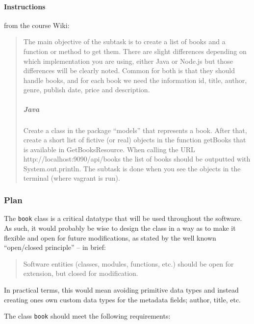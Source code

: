 \paragraph{Instructions}\label{task-1a-instructions}
from the course Wiki\cite{1dv600:lab1:instructions}:

\begin{quote}
  The main objective of the subtask is to create a list of books and a function
  or method to get them. There are slight differences depending on which
  implementation you are using, either Java or Node.js but those differences
  will be clearly noted. Common for both is that they should handle books,
  and for each book we need the information id, title, author, genre, publish
  date, price and description.

  \subparagraph{Java}
  Create a class in the package ``models'' that represents a book. After
  that, create a short list of fictive (or real) objects in the function
  getBooks that is available in GetBooksResource. When calling the URL
  http://localhost:9090/api/books the list of books should be outputted
  with System.out.println. The subtask is done when you see the objects in
  the terminal (where vagrant is run).
\end{quote}


\subsubsection{Plan}\label{task-1a-plan}
The \texttt{book} class is a critical datatype that will be used throughout the
software. As such, it would probably be wise to design the class in a way as to
make it flexible and open for future modifications, as stated by the well known
``open/closed principle''\cite{Martin:1996:OPS} -- in brief\cite{SOLID:OCP:Meyer}:

\begin{quote}
  Software entities (classes, modules, functions, etc.) should be open for
  extension, but closed for modification.
\end{quote}

In practical terms, this would mean avoiding primitive data types and instead
creating ones own custom data types for the metadata fields; author, title,
etc.


The class \texttt{book} should meet the following requirements:

